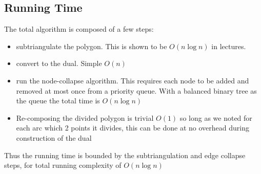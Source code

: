 \subsection{Running Time}
The total algorithm is composed of a few steps:
\begin{itemize}
	\item subtriangulate the polygon.  This is shown to be $O(n \log n)$ in lectures.
	\item convert to the dual.  Simple $O(n)$
	\item run the node-collapse algorithm.  This requires each node to be added and removed at most once from a priority queue.  With a balanced binary tree as the queue the total time is $O(n \log n)$
	\item Re-composing the divided polygon is trivial $O(1)$ so long as we noted for each arc which 2 points it divides, this can be done at no overhead during construction of the dual
\end{itemize}
Thus the running time is bounded by the subtriangulation and edge collapse steps, for total running complexity of $O(n \log n)$


